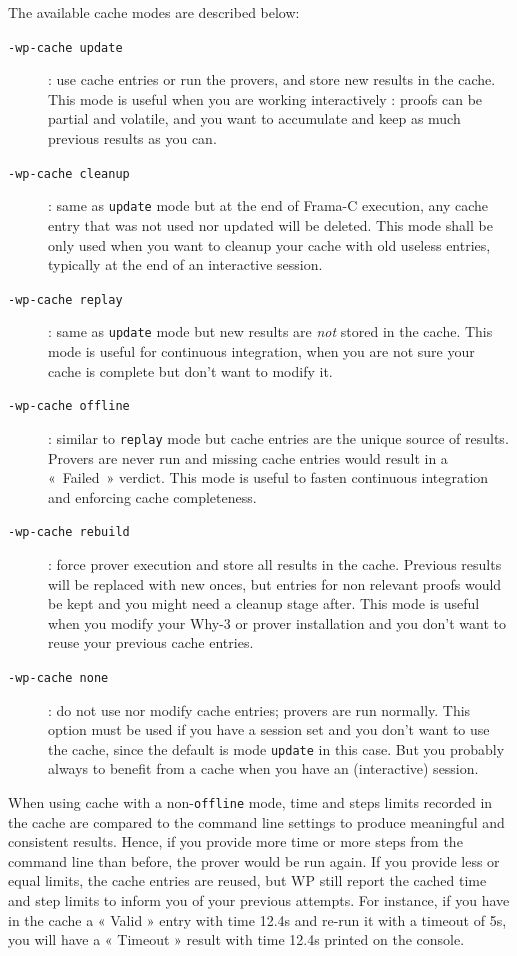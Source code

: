 The available cache modes are described below:
\begin{description}
\item [\tt -wp-cache update]: use cache entries or run the provers, and store new results in the cache. This mode is useful when you are working interactively : proofs can be partial and volatile, and you want to accumulate and keep as much previous results as you can.
\item [\tt -wp-cache cleanup]: same as \verb+update+ mode but at the end of \textsf{Frama-C} execution, any cache entry that was not used nor updated will be deleted. This mode shall be only used when you want to cleanup your cache with old useless entries, typically at the end of an interactive session.
\item [\tt -wp-cache replay]: same as \verb+update+ mode but new results are \emph{not} stored in the cache. This mode is useful for continuous integration, when you are not sure your cache is complete but don't want to modify it.
\item [\tt -wp-cache offline]: similar to \verb+replay+ mode but cache entries are the unique source of results. Provers are never run and missing cache entries would result in a «~Failed~» verdict. This mode is useful to fasten continuous integration and enforcing cache completeness.
\item [\tt -wp-cache rebuild]: force prover execution and store all results in the cache. Previous results will be replaced with new onces, but entries for non relevant proofs would be kept and you might need a cleanup stage after. This mode is useful when you modify your \textsf{Why-3} or prover installation and you don't want to reuse your previous cache entries.
\item [\tt -wp-cache none]: do not use nor modify cache entries; provers are run normally. This option must be used if you have a session set and you don't want to use the cache, since the default is mode \verb+update+ in this case. But you probably always to benefit from a cache when you have an (interactive) session.
\end{description}

When using cache with a non-\verb+offline+ mode, time and steps limits recorded in the cache are compared to the command line settings to produce meaningful and consistent results. Hence, if you provide more time or more steps from the command line than before, the prover would be run again. If you provide less or equal limits, the cache entries are reused, but \textsf{WP} still report the cached time and step limits to inform you of your previous attempts. For instance, if you have in the cache a « Valid » entry with time 12.4s and re-run it with a timeout of 5s, you will have a « Timeout » result with time 12.4s printed on the console.

